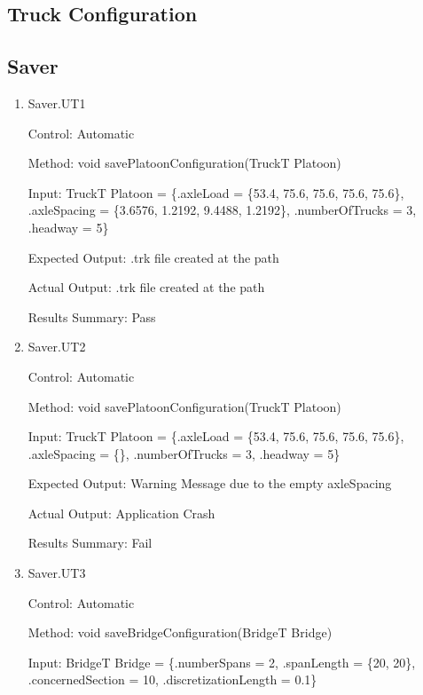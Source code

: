 \documentclass[12pt, titlepage]{article}
\begin{document}
\subsection{Truck Configuration}

\subsection{Saver}
\begin{enumerate}
    \item{Saver.UT1\\}
    
    Control: Automatic
    
    Method:  void savePlatoonConfiguration(TruckT Platoon)
    
    Input: TruckT Platoon = \{.axleLoad = \{53.4, 75.6, 75.6, 75.6, 75.6\},
                        .axleSpacing = \{3.6576, 1.2192, 9.4488, 1.2192\},
                        .numberOfTrucks = 3,
                        .headway = 5\}
    
    Expected Output: .trk file created at the path 

    Actual Output: .trk file created at the path

    Results Summary: Pass

    \item{Saver.UT2\\}
    
    Control: Automatic
    
    Method:  void savePlatoonConfiguration(TruckT Platoon)
    
    Input: TruckT Platoon = \{.axleLoad = \{53.4, 75.6, 75.6, 75.6, 75.6\},
                        .axleSpacing = \{\},
                        .numberOfTrucks = 3,
                        .headway = 5\}
    
    Expected Output: Warning Message due to the empty axleSpacing

    Actual Output: Application Crash

    Results Summary: Fail

    \item{Saver.UT3\\}
    
    Control: Automatic
    
    Method:  void saveBridgeConfiguration(BridgeT Bridge)
    
    Input: BridgeT Bridge = \{.numberSpans = 2,
                         .spanLength = \{20, 20\},
                         .concernedSection = 10,
                         .discretizationLength = 0.1\}
    

\end{enumerate}
\end{document}
